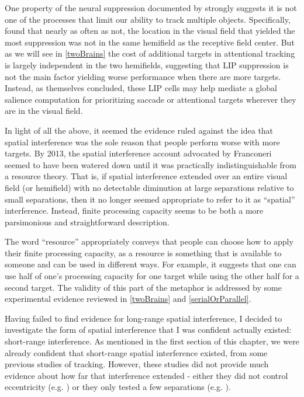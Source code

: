 \documentclass[
]{book}
\begin{document}
One property of the neural suppression documented by \citet{falknerSurroundSuppressionSharpens2010} strongly suggests it is not one of the processes that limit our ability to track multiple objects. Specifically, \citet{falknerSurroundSuppressionSharpens2010} found that nearly as often as not, the location in the visual field that yielded the most suppression was not in the same hemifield as the receptive field center. But as we will see in \ref{twoBrains} the cost of additional targets in attentional tracking is largely independent in the two hemifields, suggesting that LIP suppression is not the main factor yielding worse performance when there are more targets. Instead, as \citet{falknerSurroundSuppressionSharpens2010} themselves concluded, these LIP cells may help mediate a global salience computation for prioritizing saccade or attentional targets wherever they are in the visual field.

In light of all the above, it seemed the evidence ruled against the idea that spatial interference was the sole reason that people perform worse with more targets. By 2013, the spatial interference account advocated by Franconeri seemed to have been watered down until it was practically indistinguishable from a resource theory. That is, if spatial interference extended over an entire visual field (or hemifield) with no detectable diminution at large separations relative to small separations, then it no longer seemed appropriate to refer to it as ``spatial'' interference. Instead, finite processing capacity seems to be both a more parsimonious and straightforward description.

The word ``resource'' appropriately conveys that people can choose how to apply their finite processing capacity, as a resource is something that is available to someone and can be used in different ways. For example, it suggests that one can use half of one's processing capacity for one target while using the other half for a second target. The validity of this part of the metaphor is addressed by some experimental evidence reviewed in \ref{twoBrains} and \ref{serialOrParallel}.

Having failed to find evidence for long-range spatial interference, I decided to investigate the form of spatial interference that I was confident actually existed: short-range interference. As mentioned in the first section of this chapter, we were already confident that short-range spatial interference existed, from some previous studies of tracking. However, these studies did not provide much evidence about how far that interference extended - either they did not control eccentricity (e.g. \citet{feriaSpeedHasEffect2013}) or they only tested a few separations (e.g. \citet{tombuTrackingPlanetsMoons2011}).
\end{document}
